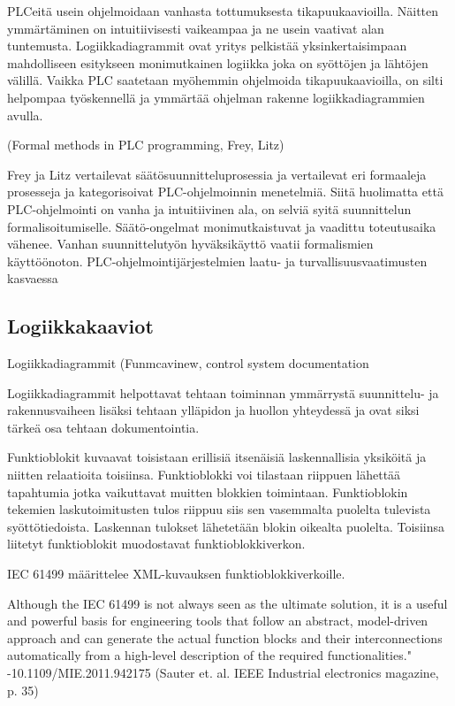 \documentclass[finnish,12pt]{article}
\begin{document}
PLCeitä usein ohjelmoidaan vanhasta tottumuksesta tikapuukaavioilla.
Näitten ymmärtäminen on intuitiivisesti vaikeampaa ja ne usein vaativat alan tuntemusta.
Logiikkadiagrammit ovat yritys pelkistää yksinkertaisimpaan mahdolliseen esitykseen monimutkainen logiikka joka on syöttöjen ja lähtöjen välillä.
Vaikka PLC saatetaan myöhemmin ohjelmoida tikapuukaavioilla, on silti helpompaa työskennellä ja ymmärtää ohjelman rakenne logiikkadiagrammien avulla.



(Formal methods in PLC programming, Frey, Litz)

Frey ja Litz vertailevat säätösuunnitteluprosessia ja vertailevat eri formaaleja prosesseja ja kategorisoivat PLC-ohjelmoinnin menetelmiä. 
Siitä huolimatta että PLC-ohjelmointi on vanha ja intuitiivinen ala, on selviä syitä suunnittelun formalisoitumiselle.
Säätö-ongelmat monimutkaistuvat ja vaadittu toteutusaika vähenee.
Vanhan suunnittelutyön hyväksikäyttö vaatii formalismien käyttöönoton.
PLC-ohjelmointijärjestelmien laatu- ja turvallisuusvaatimusten kasvaessa 



		\subsection{Logiikkakaaviot}

Logiikkadiagrammit (Funmcavinew, control system documentation

Logiikkadiagrammit helpottavat tehtaan toiminnan ymmärrystä suunnittelu- ja rakennusvaiheen lisäksi tehtaan ylläpidon ja huollon yhteydessä ja ovat siksi tärkeä osa tehtaan dokumentointia.

Funktioblokit kuvaavat toisistaan erillisiä itsenäisiä laskennallisia yksiköitä ja niitten relaatioita toisiinsa.
Funktioblokki voi tilastaan riippuen lähettää tapahtumia jotka vaikuttavat muitten blokkien toimintaan.
Funktioblokin tekemien laskutoimitusten tulos riippuu siis sen vasemmalta puolelta tulevista syöttötiedoista.
Laskennan tulokset lähetetään blokin oikealta puolelta.
Toisiinsa liitetyt funktioblokit muodostavat funktioblokkiverkon. 

IEC 61499 määrittelee XML-kuvauksen funktioblokkiverkoille. 

Although the IEC 61499 is not always seen as the ultimate solution, it is a useful and powerful basis for engineering tools that follow an abstract, model-driven approach and can generate the actual function blocks and their interconnections automatically from a high-level description of the required functionalities." -10.1109/MIE.2011.942175 (Sauter et. al. IEEE Industrial electronics magazine, p. 35)
\end{document}

